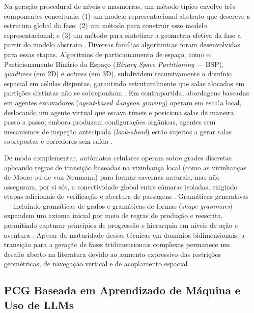 Na geração procedural de níveis e masmorras, um método típico envolve três componentes conceituais: (1) um modelo representacional abstrato que descreve a estrutura global da fase; (2) um método para construir esse modelo representacional; e (3) um método para sintetizar a geometria efetiva da fase a partir do modelo abstrato \cite{linden2014dungeons, shaker2016constructive}. Diversas famílias algorítmicas foram desenvolvidas para essas etapas. Algoritmos de particionamento de espaço, como o Particionamento Binário do Espaço (\textit{Binary Space Partitioning} --- BSP), \textit{quadtrees} (em 2D) e \textit{octrees} (em 3D), subdividem recursivamente o domínio espacial em células disjuntas, garantindo estruturalmente que salas alocadas em partições distintas não se sobreponham \cite{shaker2016constructive}. Em contrapartida, abordagens baseadas em agentes escavadores (\textit{agent-based dungeon growing}) operam em escala local, deslocando um agente virtual que escava túneis e posiciona salas de maneira passo a passo; embora produzam configurações orgânicas, agentes sem mecanismos de inspeção antecipada (\textit{look-ahead}) estão sujeitos a gerar salas sobrepostas e corredores sem saída \cite{shaker2016constructive}.

De modo complementar, autômatos celulares operam sobre grades discretas aplicando regras de transição baseadas na vizinhança local (como as vizinhanças de Moore ou de von Neumann) para formar cavernas naturais, mas não asseguram, por si sós, a conectividade global entre câmaras isoladas, exigindo etapas adicionais de verificação e abertura de passagens \cite{linden2014dungeons, shaker2016constructive}. Gramáticas generativas --- incluindo gramáticas de grafos e gramáticas de formas (\textit{shape grammars}) --- expandem um axioma inicial por meio de regras de produção e reescrita, permitindo capturar princípios de progressão e hierarquia em níveis de ação e aventura \cite{dormans2010, linden2013designing, shaker2016constructive}. Apesar da maturidade dessas técnicas em domínios bidimensionais, a transição para a geração de fases tridimensionais complexas permanece um desafio aberto na literatura devido ao aumento expressivo das restrições geométricas, de navegação vertical e de acoplamento espacial \cite{linden2014dungeons, maleki2024procedural, xu2025constraint}.

\subsection{PCG Baseada em Aprendizado de Máquina e Uso de LLMs}
\label{sec:pcgml_llms}


